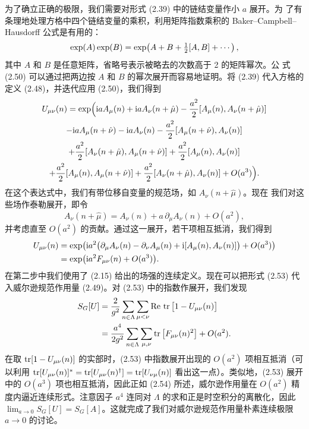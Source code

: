 为了确立正确的极限，我们需要对形式 (2.39) 中的链结变量作小 $a$ 展开。为
了有条理地处理方格中四个链结变量的乘积，利用矩阵指数乘积的
Baker--Campbell--Hausdorff 公式是有用的：
\begin{equation}
  \exp(A) \exp(B) = \exp\!\left( A + B + \tfrac{1}{2} [A, B] + \cdots \right) ,
\end{equation}
其中 $A$ 和 $B$ 是任意矩阵，省略号表示被略去的次数高于 2 的矩阵幂次。公
式 (2.50) 可以通过把两边按 $A$ 和 $B$ 的幂次展开而容易地证明。将 (2.39)
代入方格的定义 (2.48)，并迭代应用 (2.50)，我们得到
\begin{multline}
  U_{\mu\nu}(n) = \exp\!\Big(
    \mathrm{i} a A_\mu(n) + \mathrm{i} a A_\nu(n + \hat\mu)
    - \frac{a^2}{2} [A_\mu(n), A_\nu(n + \hat\mu)] \\
    - \mathrm{i} a A_\mu(n + \hat\nu) - \mathrm{i} a A_\nu(n)
    - \frac{a^2}{2} [A_\mu(n + \hat\nu), A_\nu(n)] \\
    + \frac{a^2}{2} [A_\nu(n + \hat\mu), A_\mu(n + \hat\nu)]
    + \frac{a^2}{2} [A_\mu(n), A_\nu(n)] \\
    + \frac{a^2}{2} [A_\mu(n), A_\mu(n + \hat\nu)]
    + \frac{a^2}{2} [A_\nu(n + \hat\mu), A_\nu(n)] + O(a^3) \Big) .
\end{multline}
在这个表达式中，我们有带位移自变量的规范场，如 $A_\nu(n + \hat\mu)$。现在
我们对这些场作泰勒展开，即令
\begin{equation}
  A_\nu(n + \hat\mu) = A_\nu(n) + a\, \partial_\mu A_\nu(n) + O(a^2) ,
\end{equation}
并考虑直至 $O(a^2)$ 的贡献。通过这一展开，若干项相互抵消，我们得到
\begin{equation}
  \begin{split}
    U_{\mu\nu}(n) &= \exp\!\big( \mathrm{i} a^2
      \big(\partial_\mu A_\nu(n) - \partial_\nu A_\mu(n)
      + \mathrm{i} [A_\mu(n), A_\nu(n)]\big) + O(a^3) \big) \\
    &= \exp\!\big( \mathrm{i} a^2 F_{\mu\nu}(n) + O(a^3) \big) .
  \end{split}
\end{equation}
在第二步中我们使用了 (2.15) 给出的场强的连续定义。现在可以把形式 (2.53)
代入威尔逊规范作用量 (2.49)。对 (2.53) 中的指数作展开，我们发现
\begin{equation}
  \begin{split}
    S_G[U] &= \frac{2}{g^2} \sum_{n\in\Lambda} \sum_{\mu<\nu}
      \operatorname{Re}\, \operatorname{tr}\big[1 - U_{\mu\nu}(n)\big] \\
    &= \frac{a^4}{2 g^2} \sum_{n\in\Lambda} \sum_{\mu,\nu}
      \operatorname{tr}\big[F_{\mu\nu}(n)^2\big] + O(a^2) .
  \end{split}
\end{equation}
在取 $\operatorname{tr}[1 - U_{\mu\nu}(n)]$ 的实部时，(2.53) 中指数展开出现的 $O(a^2)$
项相互抵消（可以利用
$\operatorname{tr}[U_{\mu\nu}(n)]^* = \operatorname{tr}[U_{\mu\nu}(n)^\dagger] = \operatorname{tr}[U_{\nu\mu}(n)]$
看出这一点）。类似地，(2.53) 展开中的 $O(a^3)$ 项也相互抵消，因此正如
(2.54) 所述，威尔逊作用量在 $O(a^2)$ 精度内逼近连续形式。注意因子 $a^4$
连同对 $\Lambda$ 的求和正是时空积分的离散化，因此 $\lim_{a\to 0} S_G[U] =
S_G[A]$。这就完成了我们对威尔逊规范作用量朴素连续极限 $a \to 0$ 的讨论。

